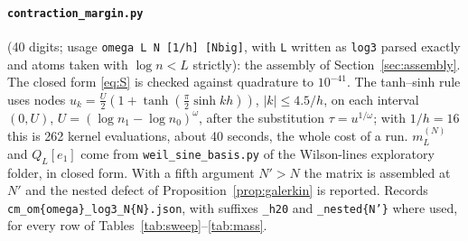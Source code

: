 \paragraph{\texttt{contraction\_margin.py}} (40 digits; usage
\texttt{omega L N [1/h] [Nbig]}, with \texttt{L} written as \texttt{log3}
parsed exactly and atoms taken with $\log n<L$ strictly): the assembly of
Section~\ref{sec:assembly}. The closed form \eqref{eq:S} is checked against
quadrature to $10^{-41}$. The tanh--sinh rule uses nodes
$u_k=\frac U2(1+\tanh(\frac\pi2\sinh kh))$, $|k|\leq4.5/h$, on each interval
$(0,U)$, $U=(\log n_1-\log n_0)^\omega$, after the substitution
$\tau=u^{1/\omega}$; with $1/h=16$ this is 262 kernel evaluations, about 40
seconds, the whole cost of a run. $m_L^{(N)}$ and $Q_L[e_1]$ come from
\texttt{weil\_sine\_basis.py} of the Wilson-lines exploratory folder, in
closed form. With a fifth argument $N'>N$ the matrix is assembled at $N'$ and
the nested defect of Proposition~\ref{prop:galerkin} is reported. Records
\texttt{cm\_om\{omega\}\_log3\_N\{N\}.json}, with suffixes \texttt{\_h20} and
\texttt{\_nested\{N'\}} where used, for every row of
Tables~\ref{tab:sweep}--\ref{tab:mass}.

